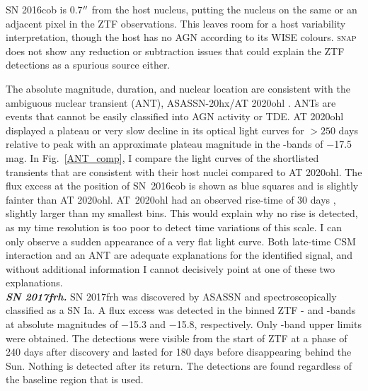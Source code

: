 \documentclass[a4paper,oneside,12pt, class=Latex/Classes/PhDthesisPSnPDF, crop=false]{standalone}
\begin{document}
SN 2016cob is 0.7$^{\prime\prime}$ from the host nucleus, putting the nucleus on the same or an adjacent pixel in the ZTF observations. This leaves room for a host variability interpretation, though the host has no AGN according to its WISE colours. \textsc{snap} does not show any reduction or subtraction issues that could explain the ZTF detections as a spurious source either.

The absolute magnitude, duration, and nuclear location are consistent with the ambiguous nuclear transient (ANT), ASASSN-20hx/AT 2020ohl \citep{Hinkle_Extreme_nuclear_transients/ANTs}. ANTs are events that cannot be easily classified into AGN activity or TDE. AT 2020ohl displayed a plateau or very slow decline in its optical light curves for $>250$ days relative to peak with an approximate plateau magnitude in the \ztfg\ztfr\ztfi-bands of $-$17.5 mag. In Fig.~\ref{ANT_comp}, I compare the light curves of the shortlisted transients that are consistent with their host nuclei compared to AT 2020ohl. The flux excess at the position of SN~2016cob is shown as blue squares and is slightly fainter than AT 2020ohl. AT~2020ohl had an observed rise-time of 30 days \citep{Hinkle_Extreme_nuclear_transients/ANTs}, slightly larger than my smallest bins. This would explain why no rise is detected, as my time resolution is too poor to detect time variations of this scale. I can only observe a sudden appearance of a very flat light curve. Both late-time CSM interaction and an ANT are adequate explanations for the identified signal, and without additional information I cannot decisively point at one of these two explanations.\\


\textit{\textbf{SN 2017frh.}}
SN 2017frh was discovered by ASASSN and spectroscopically classified as a SN Ia. A flux excess was detected in the binned ZTF \ztfg- and \ztfr-bands at absolute magnitudes of $-$15.3 and $-$15.8, respectively. Only \ztfi-band upper limits were obtained. The detections were visible from the start of ZTF at a phase of 240 days after discovery and lasted for 180 days before disappearing behind the Sun. Nothing is detected after its return. The detections are found regardless of the baseline region that is used.
\end{document}
